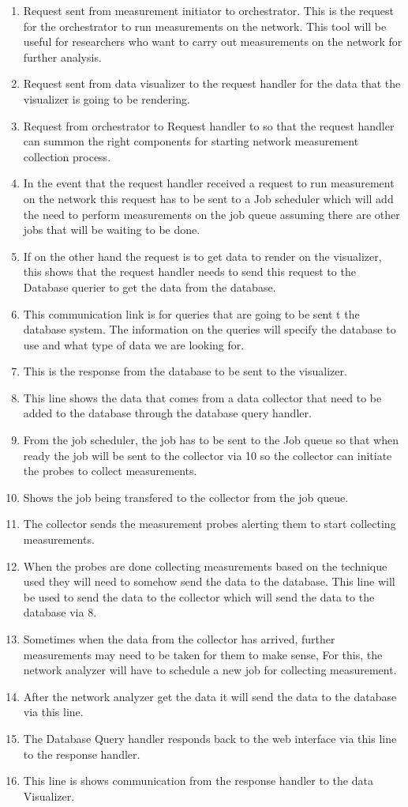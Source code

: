 \begin{enumerate}
	\item Request sent from measurement initiator to orchestrator. This is the request for the orchestrator to run measurements on the network. This tool will be useful for researchers who want to carry out measurements on the network for further analysis.
	\item Request sent from data visualizer to the request handler for the data that the visualizer is going to be rendering.
	\item Request from orchestrator to Request handler to so that the request handler can summon the right components for starting network measurement collection process.
	\item In the event that the request handler received a request to run measurement on the network this request has to be sent to a Job scheduler which will add the need to perform measurements on the job queue assuming there are other jobs that will be waiting to be done.
	\item If on the other hand the request is to get data to render on the visualizer, this shows that the request handler needs to send this request to the Database querier to get the data from the database.
	\item This communication link is for queries that are going to be sent t the database system. The information on the queries will specify the database to use and what type of data we are looking for. 
	\item This is the response from the database to be sent to the visualizer.
	\item This line shows the data that comes from a data collector that need to be added to the database through the database query handler. 
	\item From the job scheduler, the job has to be sent to the Job queue so that when ready the job will be sent to the collector via 10 so the collector can initiate the probes to collect measurements.
	\item Shows the job being transfered to the collector from the job queue.
	\item The collector sends the measurement probes alerting them to start collecting measurements.
	\item When the probes are done collecting measurements based on the technique used they will need to somehow send the data to the database. This line will be used to send the data to the collector which will send the data to the database via 8.
	\item Sometimes when the data from the collector has arrived, further measurements may need to be taken for them to make sense,  For this, the network analyzer will have to schedule a new job for collecting measurement.
	\item After the network analyzer get the data it will send the data to the database via this line.
	\item The Database Query handler responds back to the web interface via this line to the response handler.
	\item This line is shows communication from the response handler to the data Visualizer.
\end{enumerate}
